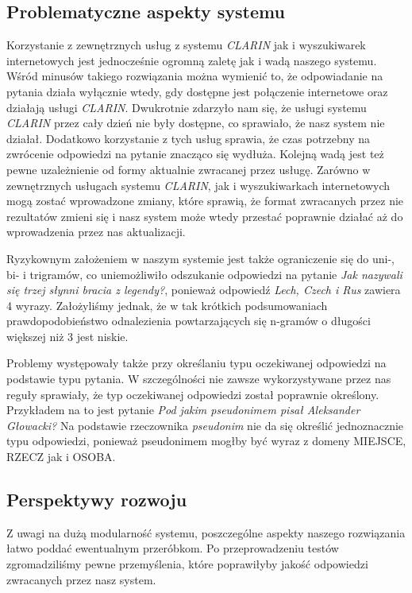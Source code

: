 





\subsection{Problematyczne aspekty systemu}

Korzystanie z zewnętrznych usług z systemu \emph{CLARIN} jak i wyszukiwarek internetowych jest jednocześnie ogromną zaletę jak i wadą naszego systemu. Wśród minusów takiego rozwiązania można wymienić to, że odpowiadanie na pytania działa wyłącznie wtedy, gdy dostępne jest połączenie internetowe oraz działają usługi \emph{CLARIN}. Dwukrotnie zdarzyło nam się, że usługi systemu \emph{CLARIN} przez cały dzień nie były dostępne, co sprawiało, że nasz system nie działał. Dodatkowo korzystanie z tych usług sprawia, że czas potrzebny na zwrócenie odpowiedzi na pytanie znacząco się wydłuża. Kolejną wadą jest też pewne uzależnienie od formy aktualnie zwracanej przez usługę. Zarówno w zewnętrznych usługach systemu \emph{CLARIN}, jak i wyszukiwarkach internetowych mogą zostać wprowadzone zmiany, które sprawią, że format zwracanych przez nie rezultatów zmieni się i nasz system może wtedy przestać poprawnie działać aż do wprowadzenia przez nas aktualizacji. 

Ryzykownym założeniem w naszym systemie jest także ograniczenie się do uni-, bi- i trigramów, co uniemożliwiło odszukanie odpowiedzi na pytanie \emph{Jak nazywali się trzej słynni bracia z legendy?}, ponieważ odpowiedź \emph{Lech, Czech i Rus} zawiera 4 wyrazy. Założyliśmy jednak, że w tak krótkich podsumowaniach prawdopodobieństwo odnalezienia powtarzających się n-gramów o długości większej niż 3 jest niskie.

Problemy występowały także przy określaniu typu oczekiwanej odpowiedzi na podstawie typu pytania. W szczególności nie zawsze wykorzystywane przez nas reguły sprawiały, że typ oczekiwanej odpowiedzi został poprawnie określony. Przykładem na to jest pytanie \emph{Pod jakim pseudonimem pisał Aleksander Głowacki?} Na podstawie rzeczownika \emph{pseudonim} nie da się określić jednoznacznie typu odpowiedzi, ponieważ pseudonimem mogłby być wyraz z domeny MIEJSCE, RZECZ jak i OSOBA.

\subsection{Perspektywy rozwoju}
Z uwagi na dużą modularność systemu, poszczególne aspekty naszego rozwiązania łatwo poddać ewentualnym przeróbkom. Po przeprowadzeniu testów zgromadziliśmy pewne przemyślenia, które poprawiłyby jakość odpowiedzi zwracanych przez nasz system. 

